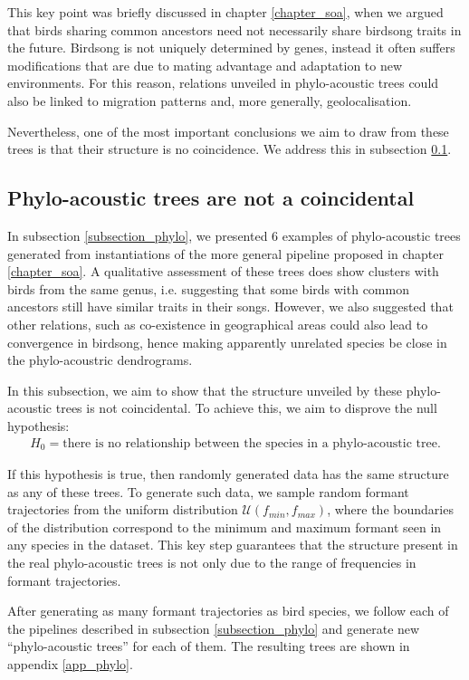 \documentclass[../main.tex]{subfiles}
\begin{document}
\par This key point was briefly discussed in chapter \ref{chapter_soa}, when we argued that birds sharing common ancestors need not necessarily share birdsong traits in the future. Birdsong is not uniquely determined by genes, instead it often suffers modifications that are due to mating advantage and adaptation to new environments. For this reason, relations unveiled in phylo-acoustic trees could also be linked to migration patterns and, more generally, geolocalisation.
\par Nevertheless, one of the most important conclusions we aim to draw from these trees is that their structure is no coincidence. We address this in subsection \ref{subsection_null}.

\subsection{Phylo-acoustic trees are not a coincidental} \label{subsection_null}
In subsection \ref{subsection_phylo}, we presented 6 examples of phylo-acoustic trees generated from instantiations of the more general pipeline proposed in chapter \ref{chapter_soa}. A qualitative assessment of these trees does show clusters with birds from the same genus, i.e. suggesting that some birds with common ancestors still have similar traits in their songs. However, we also suggested that other relations, such as co-existence in geographical areas could also lead to convergence in birdsong, hence making apparently unrelated species be close in the phylo-acoustric dendrograms.
\par In this subsection, we aim to show that the structure unveiled by these phylo-acoustic trees is not coincidental. To achieve this, we aim to disprove the null hypothesis:
\begin{align*}
H_0 = \text{there is no relationship between the species in a phylo-acoustic tree.}
\end{align*}
\par If this hypothesis is true, then randomly generated data has the same structure as any of these trees. To generate such data, we sample random formant trajectories from the uniform distribution $\mathcal{U}(f_{min}, f_{max})$, where the boundaries of the distribution correspond to the minimum and maximum formant seen in any species in the dataset. This key step guarantees that the structure present in the real phylo-acoustic trees is not only due to the range of frequencies in formant trajectories.
\par After generating as many formant trajectories as bird species, we follow each of the pipelines described in subsection \ref{subsection_phylo} and generate new ``phylo-acoustic trees'' for each of them. The resulting trees are shown in appendix \ref{app_phylo}.
\end{document}
